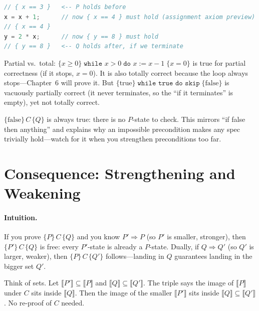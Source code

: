 \begin{lstlisting}[language=C, caption={Same idea in C: pre/post as comments. The proof obligation is that no $P$-state escapes to $\neg Q$.}, label={lst:triple-c}]
// { x == 3 }   <-- P holds before
x = x + 1;      // now { x == 4 } must hold (assignment axiom preview)
// { x == 4 }
y = 2 * x;      // now { y == 8 } must hold
// { y == 8 }   <-- Q holds after, if we terminate
\end{lstlisting}

Partial vs.\ total: $\{x\ge 0\}\;\texttt{while }x>0\;\texttt{do }x:=x-1\;\{x=0\}$ is true for partial correctness (if it stops, $x=0$). It is also totally correct because the loop always stops—Chapter~6 will prove it. But $\{ \text{true}\}\;\texttt{while true do skip}\;\{ \text{false}\}$ is vacuously partially correct (it never terminates, so the ``if it terminates'' is empty), yet not totally correct.

\begin{remark}
$\{ \text{false}\}\,C\,\{Q\}$ is always true: there is no $P$-state to check. This mirrors ``if false then anything'' and explains why an impossible precondition makes any spec trivially hold—watch for it when you strengthen preconditions too far.
\end{remark}

\section{Consequence: Strengthening and Weakening}
\label{sec:consequence}
\paragraph{Intuition.} If you prove $\{P\}\,C\,\{Q\}$ and you know $P' \Rightarrow P$ (so $P'$ is smaller, stronger), then $\{P'\}\,C\,\{Q\}$ is free: every $P'$-state is already a $P$-state. Dually, if $Q \Rightarrow Q'$ (so $Q'$ is larger, weaker), then $\{P\}\,C\,\{Q'\}$ follows—landing in $Q$ guarantees landing in the bigger set $Q'$.

Think of sets. Let $\llbracket P'\rrbracket \subseteq \llbracket P\rrbracket$ and $\llbracket Q\rrbracket \subseteq \llbracket Q'\rrbracket$. The triple says the image of $\llbracket P\rrbracket$ under $C$ sits inside $\llbracket Q\rrbracket$. Then the image of the smaller $\llbracket P'\rrbracket$ sits inside $\llbracket Q\rrbracket \subseteq \llbracket Q'\rrbracket$. No re-proof of $C$ needed.

